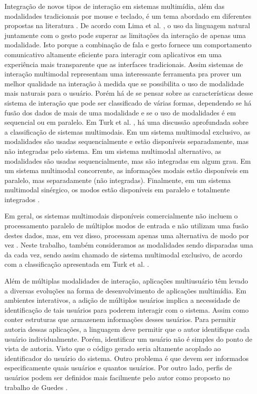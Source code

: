 Integração de novos tipos de interação em sistemas multimídia, além das modalidades tradicionais por mouse e teclado, é um tema abordado em diferentes propostas na literatura \cite{de2011multimodal,Guedes:2016aa}. De acordo com Lima et al. \cite{de2011multimodal}, o uso da linguagem natural juntamente com o gesto pode superar as limitações da interação de apenas uma modalidade. Isto porque a combinação de fala e gesto fornece um comportamento comunicativo altamente eficiente para interagir com aplicativos em uma experiência mais transparente que as interfaces tradicionais. Assim sistemas de interação multimodal representam uma interessante ferramenta pra prover um melhor qualidade na interação à medida que se possibilita o uso de modalidade mais naturais para o usuário. Porém há de se pensar sobre as características desse sistema de interação que pode ser classificado de várias formas, dependendo se há fusão dos dados de mais de uma modalidade e se o uso de modalidades é em sequencial ou em paralelo. Em Turk et al. \cite{turk2014multimodal}, há uma discussão aprofundada sobre a classificação de sistemas multimodais. Em um sistema multimodal exclusivo, as modalidades são usadas sequencialmente e estão disponíveis separadamente, mas não integradas pelo sistema. Em um sistema multimodal alternativo, as modalidades são usadas sequencialmente, mas são integradas em algum grau. Em um sistema multimodal concorrente, as informações modais estão disponíveis em paralelo, mas separadamente (não integradas). Finalmente, em um sistema multimodal sinérgico, os modos estão disponíveis em paralelo e totalmente integrados \cite{turk2014multimodal}. 

Em geral, os sistemas multimodais disponíveis comercialmente não incluem o processamento paralelo de múltiplos modos de entrada e não utilizam uma fusão destes dados, mas, em vez disso, processam apenas uma alternativa de modo por vez \cite{furht2008encyclopedia}. Neste trabalho, também consideramos as modalidades sendo disparadas uma da cada vez, sendo assim chamado de sistema multimodal exclusivo, de acordo com a classificação apresentada em Turk et al. \cite{turk2014multimodal}. 

Além de múltiplas modalidades de interação, aplicações multiusuário têm levado a diversas evoluções na forma de desenvolvimento de aplicações multimídia. Em ambientes interativos, a adição de múltiplos usuários implica a necessidade de identificação de tais usuários para poderem interagir com o sistema. Assim como conter estruturas que armazenem informações desses usuários. Para permitir autoria dessas aplicações, a linguagem deve permitir que o autor identifique cada usuário individualmente. Porém, identificar um usuário não é simples do ponto de vista de autoria. Visto que o código gerado seria altamente acoplado ao identificador do usuário do sistema.  Outro problema é que devem ser informados especificamente quais usuários e quantos usuários. Por outro lado, perfis de usuários podem ser definidos mais facilmente pelo autor como proposto no trabalho de Guedes \cite{Guedes:2016aa}. 

